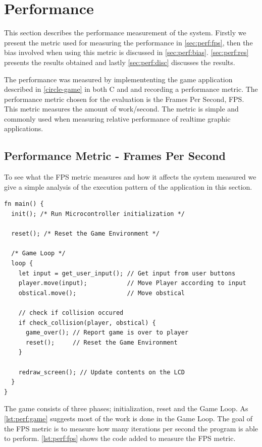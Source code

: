 \section{Performance}

This section describes the performance measurement of the system.
Firstly we present the metric used for measuring the performance in \autoref{sec:perf:fps}, then the bias involved when using this metric is discussed in \autoref{sec:perf:bias}.
\autoref{sec:perf:res} presents the results obtained and lastly \autoref{sec:perf:disc} discusses the results.

The performance was measured by implemententing the game application described in \autoref{circle-game} in both C and \rust and recording a performance metric.
The performance metric chosen for the evaluation is the Frames Per Second, FPS.
This metric measures the amount of work/second.
The metric is simple and commonly used when measuring relative performance of realtime graphic applications.

\subsection{Performance Metric - Frames Per Second}
\label{sec:perf:fps}
To see what the FPS metric measures and how it affects the system measured we give a simple analysis of the execution pattern of the application in this section.

\begin{listing}[H]
  \begin{verbatim}
fn main() {
  init(); /* Run Microcontroller initialization */

  reset(); /* Reset the Game Environment */

  /* Game Loop */
  loop {
    let input = get_user_input(); // Get input from user buttons
    player.move(input);           // Move Player according to input
    obstical.move();              // Move obstical

    // check if collision occured
    if check_collision(player, obstical) {
      game_over(); // Report game is over to player
      reset();     // Reset the Game Environment
    }

    redraw_screen(); // Update contents on the LCD
  }
}
  \end{verbatim}
  \caption{}
  \label{lst:perf:game}
\end{listing}

The game consists of three phases; initialization, reset and the Game Loop.
As \autoref{lst:perf:game} suggests most of the work is done in the Game Loop.
The goal of the FPS metric is to measure how many iterations per second the program is able to perform.
\autoref{lst:perf:fps} shows the code added to measure the FPS metric.

